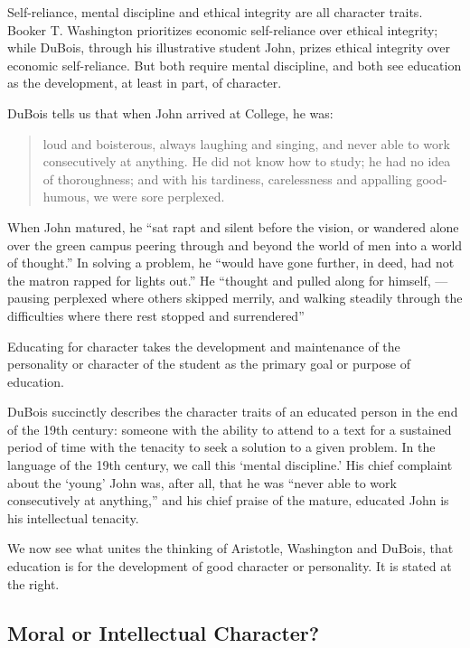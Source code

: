 Self-reliance, mental discipline and ethical integrity are all character traits. Booker T. Washington prioritizes economic self-reliance over ethical integrity; while DuBois, through his illustrative student John, prizes ethical integrity over economic self-reliance. But both require mental discipline, and both see education as the development, at least in part, of character.

DuBois tells us that when John arrived at College, he was:

\begin{quote}

loud and boisterous, always laughing and singing, and never able to work consecutively at anything. He did not know how to study; he had no idea of thoroughness; and with his tardiness, carelessness and appalling good-humous, we were sore perplexed. ~\citep[p. 143]{DuBois:1994ui}
\end{quote}

When John matured, he ``sat rapt and silent before the vision, or wandered alone over the green campus peering through and beyond the world of men into a world of thought.'' In solving a problem, he ``would have gone further, in deed, had not the matron rapped for lights out.'' He ``thought and pulled along for himself, --- pausing perplexed where others skipped merrily, and walking steadily through the difficulties where there rest stopped and surrendered'' ~\citep[p. 144]{DuBois:1994ui} 
\begin{purpose}\label{eq:character}
Educating for character takes the development and maintenance of the personality or character of the student as the primary goal or purpose of education.\end{purpose}
 

DuBois succinctly describes the character traits of an educated person in the end of the 19th century: someone with the ability to attend to a text for a sustained period of time with the tenacity to seek a solution to a given problem. In the language of the 19th century, we call this `mental discipline.' His chief complaint about the `young' John was, after all, that he was ``never able to work consecutively at anything,'' and his chief praise of the mature, educated John is his intellectual tenacity.

We now see what unites the thinking of Aristotle, Washington and DuBois, that education is for the development of good character or personality. It is stated at the right.

\subsection{Moral or Intellectual Character?}
\label{moralorintellectualcharacter}

